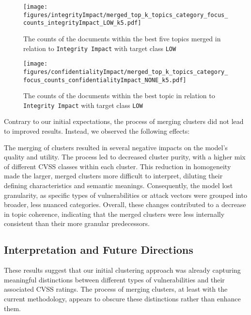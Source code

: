 \begin{figure}[t]
	\begin{center}
		\texttt{[image: figures/integrityImpact/merged\_top\_k\_topics\_category\_focus\_counts\_integrityImpact\_LOW\_k5.pdf]}
	\end{center}
	\caption{The counts of the documents within the best five topics merged in relation to \texttt{Integrity Impact} with target class \texttt{LOW}}
	\label{fig:integrityImpact_60_NONE_merged}
\end{figure}

\begin{figure}[t]
	\begin{center}
		\texttt{[image: figures/confidentialityImpact/merged\_top\_k\_topics\_category\_focus\_counts\_confidentialityImpact\_NONE\_k5.pdf]}
	\end{center}
	\caption{The counts of the documents within the best topic in relation to \texttt{Integrity Impact} with target class \texttt{LOW}}
	\label{fig:confidentialityImpact_60_LOW_merged}
\end{figure}

Contrary to our initial expectations, the process of merging clusters did not lead to improved results. Instead, we observed the following effects:

The merging of clusters resulted in several negative impacts on the model's quality and utility. The process led to decreased cluster purity, with a higher mix of different CVSS classes within each cluster. This reduction in homogeneity made the larger, merged clusters more difficult to interpret, diluting their defining characteristics and semantic meanings. Consequently, the model lost granularity, as specific types of vulnerabilities or attack vectors were grouped into broader, less nuanced categories. Overall, these changes contributed to a decrease in topic coherence, indicating that the merged clusters were less internally consistent than their more granular predecessors.

\subsection{Interpretation and Future Directions}

These results suggest that our initial clustering approach was already capturing meaningful distinctions between different types of vulnerabilities and their associated CVSS ratings. The process of merging clusters, at least with the current methodology, appears to obscure these distinctions rather than enhance them.

